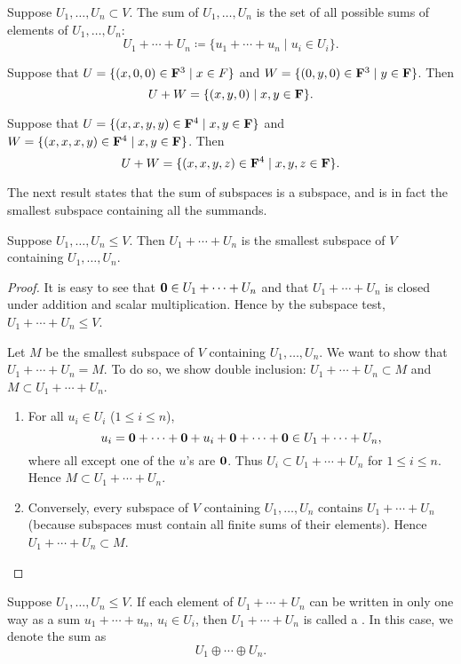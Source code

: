 \begin{definition}
Suppose $U_1,\dots,U_n\subset V$. The sum of $U_1,\dots,U_n$ is the set of all possible sums of elements of $U_1,\dots,U_n$:
\[U_1+\cdots+U_n\coloneqq\{u_1+\cdots+u_n\mid u_i\in U_i\}.\]
\end{definition}

\begin{example}
Suppose that $U=\{(x,0,0)\in\mathbf F^3\mid x\in F\}$ and $W=\{(0,y,0)\in\mathbf F^3\mid y\in\mathbf F\}$. Then
\[U+W=\{(x,y,0)\mid x,y\in\mathbf F\}.\]

Suppose that $U=\{(x,x,y,y)\in\mathbf F^4\mid x,y\in\mathbf F\}$ and $W=\{(x,x,x,y)\in\mathbf F^4\mid x,y\in\mathbf F\}$. Then
\[U+W=\{(x,x,y,z)\in\mathbf F^4\mid x,y,z\in\mathbf F\}.\]
\end{example}

The next result states that the sum of subspaces is a subspace, and is in fact the smallest subspace containing all the summands.

\begin{proposition}
Suppose $U_1,\dots,U_n\le V$. Then $U_1+\cdots+U_n$ is the smallest subspace of $V$ containing $U_1,\dots,U_n$.
\end{proposition}

\begin{proof}
It is easy to see that $\vb{0}\in U_1+\cdots+U_n$ and that $U_1+\cdots+U_n$ is closed under addition and scalar multiplication. Hence by the subspace test, $U_1+\cdots+U_n\le V$.

Let $M$ be the smallest subspace of $V$ containing $U_1,\dots,U_n$. We want to show that $U_1+\cdots+U_n=M$. To do so, we show double inclusion: $U_1+\cdots+U_n\subset M$ and $M\subset U_1+\cdots+U_n$.
\begin{enumerate}[label=(\roman*)]
\item For all $u_i\in U_i$ ($1\le i\le n$),
\[u_i=\vb{0}+\cdots+\vb{0}+u_i+\vb{0}+\cdots+\vb{0}\in U_1+\cdots+U_n,\]
where all except one of the $u$'s are $\vb{0}$. Thus $U_i\subset U_1+\cdots+U_n$ for $1\le i\le n$. Hence $M\subset U_1+\cdots+U_n$.
\item Conversely, every subspace of $V$ containing $U_1,\dots,U_n$ contains $U_1+\cdots+U_n$ (because subspaces must contain all finite sums of their elements). Hence $U_1+\cdots+U_n\subset M$.
\end{enumerate}
\end{proof}

\begin{definition}\label{def:direct-sum}
Suppose $U_1,\dots,U_n\le V$. If each element of $U_1+\cdots+U_n$ can be written in only one way as a sum $u_1+\cdots+u_n$, $u_i\in U_i$, then $U_1+\cdots+U_n$ is called a . In this case, we denote the sum as
\[U_1\oplus\cdots\oplus U_n.\]
\end{definition}

